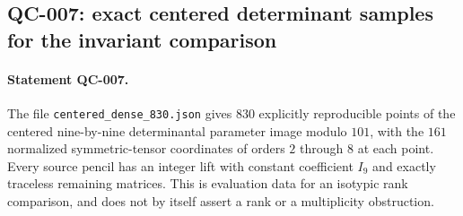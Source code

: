 \subsection{QC-007: exact centered determinant samples for the invariant comparison}

\paragraph{Statement QC-007.}
The file \texttt{centered\_dense\_830.json} gives $830$ explicitly
reproducible points of the centered nine-by-nine determinantal
parameter image modulo $101$, with the $161$ normalized
symmetric-tensor coordinates of orders $2$ through $8$ at each
point. Every source pencil has an integer lift with constant
coefficient $I_9$ and exactly traceless remaining matrices.
This is evaluation data for an isotypic rank comparison, and
does not by itself assert a rank or a multiplicity obstruction.

